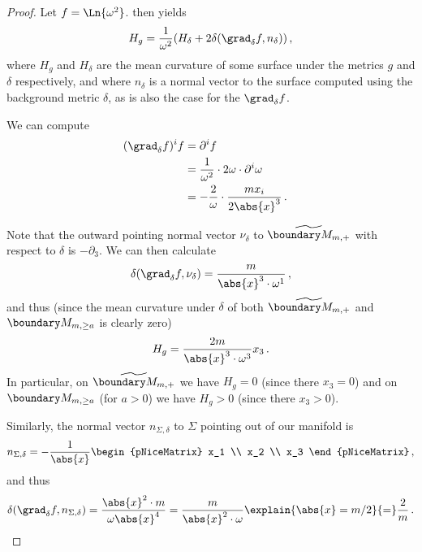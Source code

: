 \documentclass[titlepage,numbers=noenddot,oneside,%
cleardoublepage=empty,paper=a4,fontsize=11pt,%
english,%
]{scrartcl}
\newcommand*{\mathcomma}{\,,}
\newcommand*{\mathfullstop}{\,.}
\begin{document}
\begin{proof}
    Let \( f=\Ln{\omega^2} \).  then yields
    \begin{equation*}
        H_{g}=\frac{1}{\omega^2}(H_{\delta}+2 \delta(\grad_\delta f,n_\delta))\mathcomma
    \end{equation*}
    where \( H_g \) and \( H_\delta \) are the mean curvature of some surface under the metrics \( g \) and \( \delta \) respectively, and where \( n_\delta \) is a normal vector to the surface computed using the background metric \( \delta \), as is also the case for the \( \grad_{\delta} f \).

    We can compute
    \begin{align*}
        &(\grad_\delta f)^i f\begin{aligned}[t]
            &=\partial^i f\\
            &=\frac{1}{\omega^2}\cdot2 \omega\cdot \partial^i \omega\\
            &=-\frac{2}{\omega}\cdot \frac{m x_i}{2\abs{x}^3}\mathfullstop
        \end{aligned}
    \end{align*}
    
    Note that the outward pointing normal vector \( \nu_\delta \) to \( \schwarzschildboundary \) with respect to \( \delta \) is \( -\partial_3 \).  We can then calculate
    \begin{equation*}
        \delta(\grad_\delta f,\nu_\delta)=\frac{m}{\abs{x}^3\cdot \omega^1}\mathcomma
    \end{equation*}
    and thus (since the mean curvature under \( \delta \) of both \( \schwarzschildboundary \) and \( \modifiedschwarzschildboundary \) is clearly zero)
    \begin{equation*}
        H_g=\frac{2m}{\abs{x}^3\cdot \omega^3}x_3\mathfullstop
    \end{equation*}
    In particular, on \( \schwarzschildboundary \) we have \( H_g=0 \) (since there \( x_3=0 \)) and on \( \modifiedschwarzschildboundary \) (for \( a>0 \)) we have \( H_g>0 \) (since there \( x_3>0 \)).

    Similarly, the normal vector \( n_{\Sigma,\delta} \) to \( \Sigma \) pointing out of our manifold is
    \begin{equation*}
        n_{\Sigma,\delta} =-\frac{1}{\abs{x}} \begin{pNiceMatrix} x_1 \\ x_2 \\ x_3 \end{pNiceMatrix}\mathcomma
    \end{equation*}
    and thus
    \begin{equation*}
        \delta(\grad_\delta f,n_{\Sigma,\delta})=\frac{\abs{x}^2\cdot m}{\omega\abs{x}^4}=\frac{m}{\abs{x}^2\cdot \omega}\explain{\abs{x}=m/2}{=}\frac{2}{m}\mathfullstop
    \end{equation*}


\end{proof}
\end{document}
